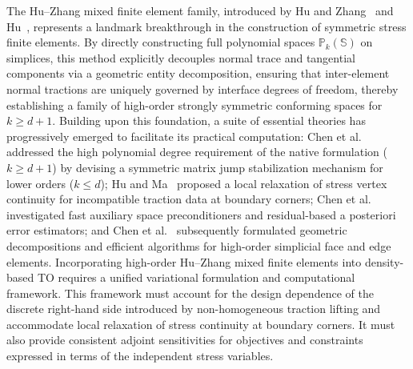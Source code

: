The Hu--Zhang mixed finite element family, introduced by Hu and Zhang~\cite{HuZhang2014} and Hu~\cite{Hu2015}, represents a landmark breakthrough in the construction of symmetric stress finite elements. By directly constructing full polynomial spaces $\mathbb{P}_k(\mathbb{S})$ on simplices, this method explicitly decouples normal trace and tangential components via a geometric entity decomposition, ensuring that inter-element normal tractions are uniquely governed by interface degrees of freedom, thereby establishing a family of high-order strongly symmetric conforming spaces for $k\ge d+1$. Building upon this foundation, a suite of essential theories has progressively emerged to facilitate its practical computation: Chen et al.~\cite{Chen2017} addressed the high polynomial degree requirement of the native formulation ($k \ge d+1$) by devising a symmetric matrix jump stabilization mechanism for lower orders ($k \le d$); Hu and Ma~\cite{HuMa2021} proposed a local relaxation of stress vertex continuity for incompatible traction data at boundary corners; Chen et al.~\cite{Chen2018a,Chen2018b} investigated fast auxiliary space preconditioners and residual-based a posteriori error estimators; and Chen et al.~\cite{Chen2024} subsequently formulated geometric decompositions and efficient algorithms for high-order simplicial face and edge elements. Incorporating high-order Hu--Zhang mixed finite elements into density-based TO requires a unified variational formulation and computational framework. This framework must account for the design dependence of the discrete right-hand side introduced by non-homogeneous traction lifting and accommodate local relaxation of stress continuity at boundary corners. It must also provide consistent adjoint sensitivities for objectives and constraints expressed in terms of the independent stress variables.

